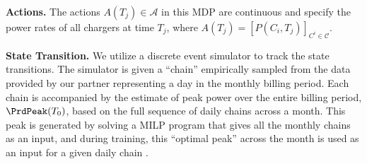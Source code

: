 

{\bf Actions.} The actions $A(T_j) \in \mathcal{A}$ in this MDP are continuous and specify the power rates of all chargers at time $T_j$, where $A(T_j) = [P(C_i, T_j)]_{C^i \in \mathcal{C}}$.

{\bf State Transition.} We utilize a discrete event simulator to track the state transitions.  The simulator is given a ``chain'' empirically sampled from the data provided by our partner representing a day in the monthly billing period. 
Each chain is accompanied by the estimate of peak power over the entire billing period, $\PrdPeak(T_0)$, based on the full sequence of daily chains across a month. This peak is generated by solving a MILP program that gives all the monthly chains as an input, and during training, this ``optimal peak'' across the month is used as an input for a given daily chain .


